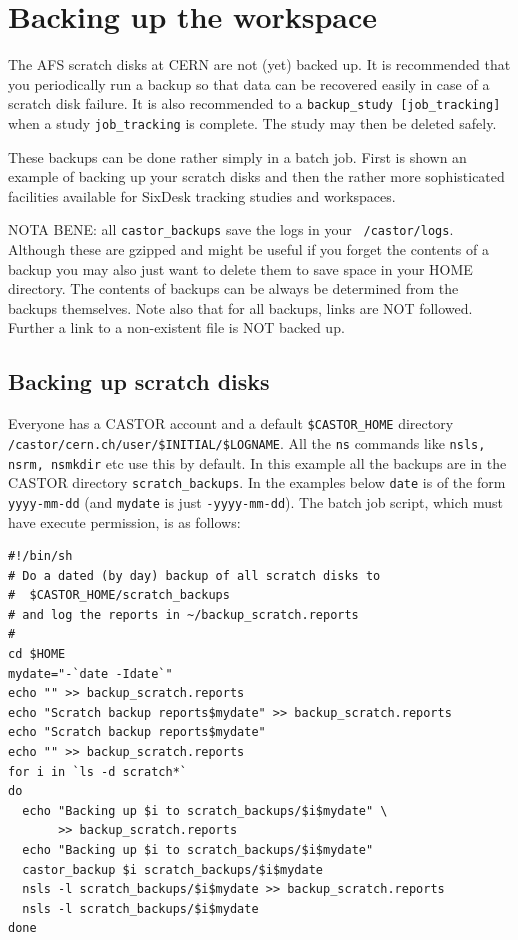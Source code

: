 \documentclass{article}    %
\begin{document}
\section{Backing up the workspace}
\label{sec:backup}
The AFS scratch disks at CERN are not (yet) backed up.
It is recommended that you periodically run a backup so that data can be recovered 
easily in case of a scratch disk failure. It is also recommended to a
{\tt backup\_study [job\_tracking]} when a study {\tt job\_tracking} is complete.
The study may then be deleted safely.

 These backups can be done rather simply in a batch job. First is shown an example of 
backing up your scratch disks and then the rather more sophisticated
facilities available for SixDesk tracking studies and workspaces.

NOTA BENE: all {\tt castor\_backups} save the logs in your {\tt ~/castor/logs}. Although
these are gzipped and might be useful if you forget the contents of a backup
you may also just want to delete them to save space in your HOME directory.
The contents of backups can be always be determined from the backups
themselves. Note also that for all backups, links are NOT followed. Further
a link to a non-existent file is NOT backed up.

 \subsection{Backing up scratch disks}
 Everyone has a CASTOR account and a default {\tt \$CASTOR\_HOME} directory
{\tt /castor/cern.ch/user/\$INITIAL/\$LOGNAME}. All the {\tt ns} commands like
{\tt nsls, nsrm, nsmkdir} etc use this by default. In this example
all the backups are in the CASTOR directory {\tt scratch\_backups}. 
In the examples below {\tt date} is of the form {\tt yyyy-mm-dd} 
(and {\tt mydate} is just {\tt -yyyy-mm-dd}).
The batch job script, which must have execute permission, is as follows:
\begin{verbatim}
#!/bin/sh
# Do a dated (by day) backup of all scratch disks to 
#  $CASTOR_HOME/scratch_backups
# and log the reports in ~/backup_scratch.reports
#
cd $HOME
mydate="-`date -Idate`"
echo "" >> backup_scratch.reports
echo "Scratch backup reports$mydate" >> backup_scratch.reports
echo "Scratch backup reports$mydate"
echo "" >> backup_scratch.reports
for i in `ls -d scratch*`
do
  echo "Backing up $i to scratch_backups/$i$mydate" \
       >> backup_scratch.reports
  echo "Backing up $i to scratch_backups/$i$mydate"
  castor_backup $i scratch_backups/$i$mydate
  nsls -l scratch_backups/$i$mydate >> backup_scratch.reports
  nsls -l scratch_backups/$i$mydate
done
\end{verbatim}
\end{document}
